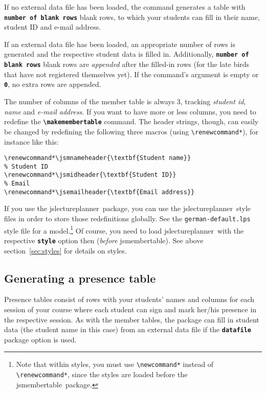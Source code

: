 \documentclass[english]{article}
\newcommand*\jmacro[1]{\textbf{\texttt{#1}}}
\newcommand*\jcsmacro[1]{\jmacro{\textbackslash{#1}}}
\newcommand*\joption[1]{\textbf{\texttt{#1}}}
\newcommand*\jfmacro[1]{\texttt{#1}}
\newcommand*\jfcsmacro[1]{\jfmacro{\textbackslash{#1}}}
\newcommand*\jparam[1]{\angus #1\angud}
\newcommand*\jslp{\textsf{jslectureplanner}}
\newcommand*\jsmt{\textsf{jsmembertable}}
\begin{document}
If no external data file has been loaded, the command generates a table with \joption{\jparam{number of blank rows}}
blank rows, to which your students can fill in their name, student ID and e-mail address.

If an external data file has been loaded, an appropriate number of rows is generated and the
respective student data is filled in. Additionally, \joption{\jparam{number of blank rows}} blank rows are
\emph{appended} after the filled-in rows (for the late birds that have not registered themselves yet).
If the command's argument is empty or \joption{0}, no extra rows are appended.

The number of columns of the member table is always 3, tracking \emph{student id},
\emph{name} and \emph{e-mail address}.
If you want to have more or less columns, you need to redefine the
\jcsmacro{makemembertable} command.
The header strings, though, can easily be changed by redefining the following three
macros (using \jfcsmacro{renewcommand*}), for instance like this:
\begin{lstlisting}[language={[LaTeX]TeX},basicstyle={\small\ttfamily},frame=single]
% Student Name
\renewcommand*\jsmnameheader{\textbf{Student name}}
% Student ID
\renewcommand*\jsmidheader{\textbf{Student ID}}
% Email
\renewcommand*\jsemailheader{\textbf{Email address}}
\end{lstlisting}
If you use the \jslp\ package, you can use the \jslp\
style files in order to store those redefinitions globally.
See the \texttt{german-default.lps} style file for a model.\footnote{%
Note that within styles, you must use \jfcsmacro{newcommand*} instead of
\jfcsmacro{renewcommand*}, since the styles are loaded before the \jsmt\ package.}
Of course, you need to load \jslp\ with the respective \joption{style} option then
(\emph{before} \jsmt).
See above section~\ref{sec:styles} for details on styles.

\subsection{Generating a presence table}

Presence tables consist of rows with your students' names and columns for each session
of your course where each student can sign and mark her/his presence in the respective
session. As with the member tables, the package can fill in student data (the student
name in this case) from an external data file if the \joption{datafile} package option
is used.
\end{document}

